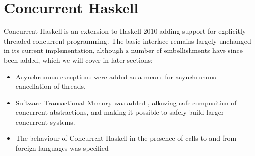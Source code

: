 \part{Concurrent Haskell}
\label{sec:concurrent}

Concurrent Haskell \cite{jones96concurrent} is an extension to Haskell
2010 \cite{haskell2010} adding support for explicitly threaded
concurrent programming.  The basic interface remains largely unchanged
in its current implementation, although a number of embellishments have
since been added, which we will cover in later sections:

\begin{itemize}
\item Asynchronous exceptions \cite{spj:asynch-exceptions} were added
  as a means for asynchronous cancellation of threads,
\item Software Transactional Memory was added \cite{stm}, allowing
  safe composition of concurrent abstractions, and making it possible
  to safely build larger concurrent systems.
\item The behaviour of Concurrent Haskell in the presence of calls to
  and from foreign languages was specified \cite{conc-ffi}
\end{itemize}















